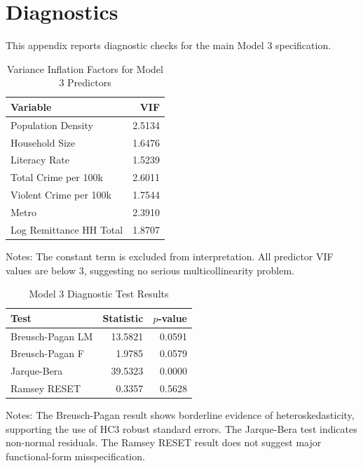 \documentclass[12pt,a4paper]{article}
\begin{document}

\section{Diagnostics}

This appendix reports diagnostic checks for the main Model 3 specification.

\begin{table}[H]
\centering
\caption{Variance Inflation Factors for Model 3 Predictors}
\label{tab:appendix_vif}
\footnotesize
\begin{tabular}{lr}
\toprule
Variable & VIF \\
\midrule
Population Density & 2.5134 \\
Household Size & 1.6476 \\
Literacy Rate & 1.5239 \\
Total Crime per 100k & 2.6011 \\
Violent Crime per 100k & 1.7544 \\
Metro & 2.3910 \\
Log Remittance HH Total & 1.8707 \\
\bottomrule
\end{tabular}
\begin{flushleft}
\footnotesize Notes: The constant term is excluded from interpretation. All predictor VIF values are below 3, suggesting no serious multicollinearity problem.
\end{flushleft}
\end{table}


\begin{table}[H]
\centering
\caption{Model 3 Diagnostic Test Results}
\label{tab:appendix_diagnostics}
\footnotesize
\begin{tabular}{lrr}
\toprule
Test & Statistic & $p$-value \\
\midrule
Breusch-Pagan LM & 13.5821 & 0.0591 \\
Breusch-Pagan F & 1.9785 & 0.0579 \\
Jarque-Bera & 39.5323 & 0.0000 \\
Ramsey RESET & 0.3357 & 0.5628 \\
\bottomrule
\end{tabular}
\begin{flushleft}
\footnotesize Notes: The Breusch-Pagan result shows borderline evidence of heteroskedasticity, supporting the use of HC3 robust standard errors. The Jarque-Bera test indicates non-normal residuals. The Ramsey RESET result does not suggest major functional-form misspecification.
\end{flushleft}
\end{table}
\end{document}
